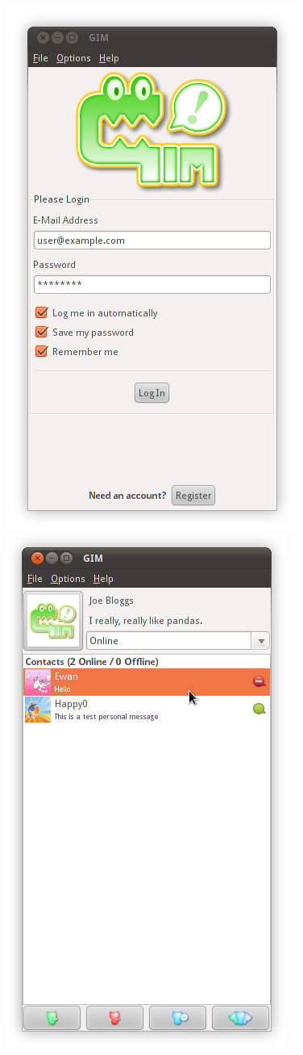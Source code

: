 \begin{figure}
    \begin{center}
        \includegraphics[scale=0.6]{Implementation/diagrams/login.png}
        \includegraphics[scale=0.6]{Implementation/diagrams/main.png}

\end{center}
\end{figure}
